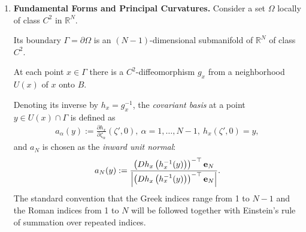 \documentclass{book}
\numberwithin{equation}{section}
\newtheorem{definition}{Definition}[section]
\begin{document}
\begin{enumerate}
    The definition of the Hausdorff measure and the Hausdorff dimension extend from integers $d$ to reals $s$, $0\le s\le\infty$, by modifying Definition 3.3 as follows.
    
    \begin{definition}
        For any real $s$, $0\le s\le\infty$, the $s$-dimensional Hausdorff measure $H_s(A)$ of a subset $A$ of $\mathbb{R}^N$ is defined by the following process. For $\delta$ small, cover $A$ efficiently by countably many sets $S_j$ with ${\rm diam}(S_j)\le\delta$, and add all the terms
        \begin{align*}
            \alpha(s)\left(\frac{{\rm diam}\left(S_j\right)}{2}\right)^d,
        \end{align*}
        where \textbf{(3.16)}
        \begin{align*}
            \alpha(s) := \frac{\pi^{s/2}}{\Gamma\left(\frac{s}{2} + 1\right)},\ \Gamma(t) := \int_0^\infty e^{-x}x^{t - 1}.
        \end{align*}
        Take the limit as $\delta\to 0$:
        \begin{align*}
            H_s(A) := \lim_{\delta\downarrow 0}\inf_{A\subset\bigcup S_j,\,{\rm diam}\left(S_j\right)\le\delta} \sum_j \alpha(s)\left(\frac{{\rm diam}\left(S_j\right)}{2}\right)^d,
        \end{align*}
        where the infimum is taken over all countable covers $\{S_j\}$ of $A$ whose members have diameter at most $\delta$. The Hausdorff dimension is defined by the same formula (3.15).
    \end{definition}
    \item \textbf{Fundamental Forms and Principal Curvatures.} Consider a set $\Omega$ locally of class $C^2$ in $\mathbb{R}^N$.
    
    Its boundary $\Gamma = \partial\Omega$ is an $(N - 1)$-dimensional submanifold of $\mathbb{R}^N$ of class $C^2$.
    
    At each point $x\in\Gamma$ there is a $C^2$-diffeomorphism $g_x$ from a neighborhood $U(x)$ of $x$ onto $B$.
    
    Denoting its inverse by $h_x = g_x^{-1}$, the \textit{covariant basis} at a point $y\in U(x)\cap\Gamma$ is defined as
    \begin{align*}
        a_\alpha(y) := \frac{\partial h_x}{\partial\zeta_\alpha}\left(\zeta',0\right),\ \alpha = 1,\ldots,N - 1,\ h_x\left(\zeta',0\right) = y,
    \end{align*}
    and $a_N$ is chosen as the \textit{inward unit normal}:
    \begin{align*}
        a_N(y) := \frac{\left(Dh_x\left(h_x^{-1}(y)\right)\right)^{-\top}{\bf e}_N}{\left|\left(Dh_x\left(h_x^{-1}(y)\right)\right)^{-\top}{\bf e}_N\right|}.
    \end{align*}
    The standard convention that the Greek indices range from 1 to $N - 1$ and the Roman indices from 1 to $N$ will be followed together with Einstein's rule of summation over repeated indices.
    

\end{enumerate}
\end{document}
